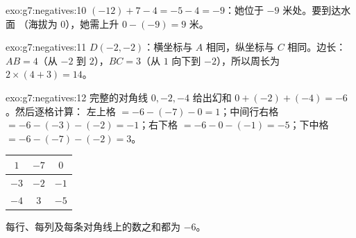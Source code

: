 \begin{solution}{exo:g7:negatives:10}
$(-12) + 7 - 4 = -5 - 4 = -9$：她位于 $-9$ 米处。要到达水面
（海拔为 $0$），她需上升 $0 - (-9) = 9$ 米。
\end{solution}

\begin{solution}{exo:g7:negatives:11}
$D(-2, -2)$：横坐标与 $A$ 相同，纵坐标与
$C$ 相同。边长：$AB = 4$（从 $-2$ 到 $2$），$BC = 3$（从 $1$ 向下到
$-2$），所以周长为 $2 \times (4 + 3) = 14$。
\end{solution}

\begin{solution}{exo:g7:negatives:12}
完整的对角线 $0, -2, -4$ 给出幻和
$0 + (-2) + (-4) = -6$。然后逐格计算：
左上格 $= -6 - (-7) - 0 = 1$；中间行右格 $= -6 - (-3) - (-2) =
-1$；右下格 $= -6 - 0 - (-1) = -5$；下中格
$= -6 - (-7) - (-2) = 3$。
\begin{center}
\renewcommand{\arraystretch}{1.4}
\begin{tabular}{|c|c|c|}
\hline
$1$ & $-7$ & $0$ \\
\hline
$-3$ & $-2$ & $-1$ \\
\hline
$-4$ & $3$ & $-5$ \\
\hline
\end{tabular}
\end{center}
每行、每列及每条对角线上的数之和都为 $-6$。
\end{solution}

